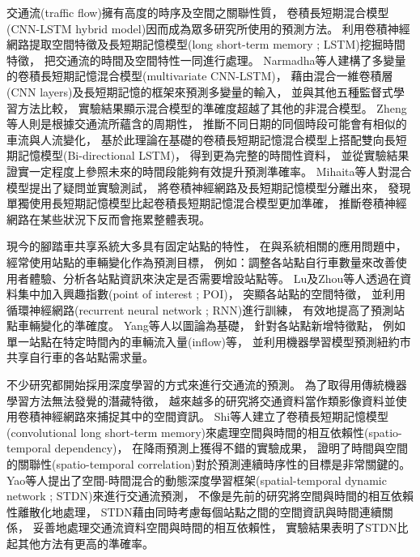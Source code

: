 \documentclass[a4paper,12pt]{extarticle}
\begin{document}
            交通流(traffic flow)擁有高度的時序及空間之關聯性質，
            卷積長短期混合模型(CNN-LSTM hybrid model)因而成為眾多研究所使用的預測方法。
            利用卷積神經網路提取空間特徵及長短期記憶模型(long short-term memory ; LSTM)挖掘時間特徵，
            把交通流的時間及空間特性一同進行處理。
            Narmadha等人\cite{NARMADHA2021}建構了多變量的卷積長短期記憶混合模型(multivariate CNN-LSTM)，
            藉由混合一維卷積層(CNN layers)及長短期記憶的框架來預測多變量的輸入，
            並與其他五種監督式學習方法比較，
            實驗結果顯示混合模型的準確度超越了其他的非混合模型。
            Zheng等人\cite{8171119}則是根據交通流所蘊含的周期性，
            推斷不同日期的同個時段可能會有相似的車流與人流變化，
            基於此理論在基礎的卷積長短期記憶混合模型上搭配雙向長短期記憶模型(Bi-directional LSTM)，
            得到更為完整的時間性資料，
            並從實驗結果證實一定程度上參照未來的時間段能夠有效提升預測準確率。
            Mihaita等人\cite{8916852}對混合模型提出了疑問並實驗測試，
            將卷積神經網路及長短期記憶模型分離出來，
            發現單獨使用長短期記憶模型比起卷積長短期記憶混合模型更加準確，
            推斷卷積神經網路在某些狀況下反而會拖累整體表現。
            
            現今的腳踏車共享系統大多具有固定站點的特性，
            在與系統相關的應用問題中，
            經常使用站點的車輛變化作為預測目標，
            例如：調整各站點自行車數量來改善使用者體驗、分析各站點資訊來決定是否需要增設站點\cite{PARK2017154}等。
            Lu\cite{9093851}及Zhou\cite{8621918}等人透過在資料集中加入興趣指數(point of interest ; POI)，
            突顯各站點的空間特徵，
            並利用循環神經網路(recurrent neural network ; RNN)進行訓練，
            有效地提高了預測站點車輛變化的準確度。
            Yang等人\cite{YANG2020101521}以圖論為基礎，
            針對各站點新增特徵點，
            例如單一站點在特定時間內的車輛流入量(inflow)等，
            並利用機器學習模型預測紐約市共享自行車的各站點需求量。
         
            不少研究都開始採用深度學習的方式\cite{Lv2015TrafficFP}來進行交通流的預測。
            為了取得用傳統機器學習方法無法發覺的潛藏特徵，
            越來越多的研究將交通資料當作類影像資料並使用卷積神經網路來捕捉其中的空間資訊。
            Shi\cite{shi2015convolutional}等人建立了卷積長短期記憶模型(convolutional long short-term memory)來處理空間與時間的相互依賴性(spatio-temporal dependency)，
            在降雨預測上獲得不錯的實驗成果，
            證明了時間與空間的關聯性(spatio-temporal correlation)對於預測連續時序性的目標是非常關鍵的。
            Yao等人\cite{yao2019revisiting}提出了空間-時間混合的動態深度學習框架(spatial-temporal dynamic network ; STDN)來進行交通流預測，
            不像是先前的研究將空間與時間的相互依賴性離散化地處理，
            STDN藉由同時考慮每個站點之間的空間資訊與時間連續關係，
            妥善地處理交通流資料空間與時間的相互依賴性，
            實驗結果表明了STDN比起其他方法有更高的準確率。
\end{document}
